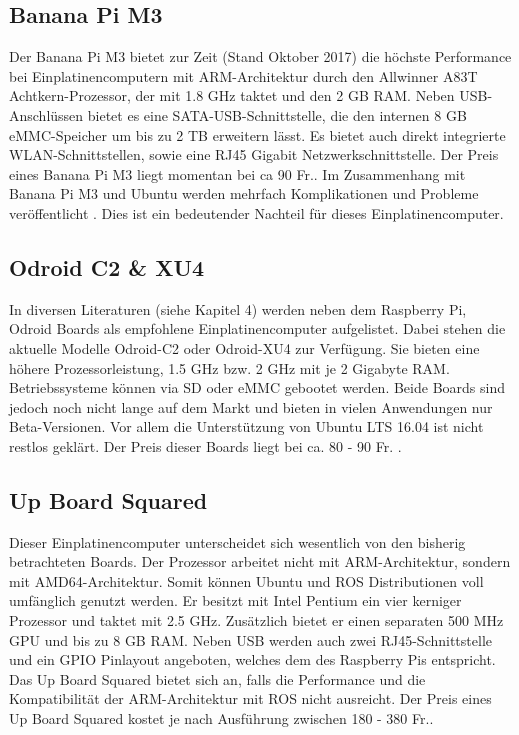 \subsection{Banana Pi M3}
\label{subsec:BananaPi}
Der Banana Pi M3 bietet zur Zeit (Stand Oktober 2017) die höchste Performance bei Einplatinencomputern mit \ac{ARM}-Architektur durch den Allwinner A83T Achtkern-Prozessor, der mit 1.8 GHz taktet und den 2 GB RAM. Neben USB-Anschlüssen bietet es eine SATA-USB-Schnittstelle, die den internen 8 GB \ac{eMMC}-Speicher um bis zu 2 TB erweitern lässt. Es bietet auch direkt integrierte WLAN-Schnittstellen, sowie eine RJ45 Gigabit Netzwerkschnittstelle. Der Preis eines Banana Pi M3 liegt momentan bei ca 90 Fr.. Im Zusammenhang mit Banana Pi M3 und Ubuntu werden mehrfach Komplikationen und Probleme veröffentlicht \cite{rpi} \cite{banana}. Dies ist ein bedeutender Nachteil für dieses Einplatinencomputer. 

\subsection{Odroid C2 \& XU4} 
\label{subsec:Odroid}
In diversen Literaturen (siehe \cite{ROSprojects} Kapitel 4) werden neben dem Raspberry Pi, Odroid Boards als empfohlene Einplatinencomputer aufgelistet. Dabei stehen die aktuelle Modelle Odroid-C2 oder Odroid-XU4 zur Verfügung. Sie bieten eine höhere Prozessorleistung, 1.5 GHz bzw. 2 GHz mit je 2 Gigabyte \ac{RAM}. Betriebssysteme können via \ac{SD} oder \ac{eMMC} gebootet werden. Beide Boards sind jedoch noch nicht lange auf dem Markt und bieten in vielen Anwendungen nur Beta-Versionen. Vor allem die Unterstützung von Ubuntu LTS 16.04 ist nicht restlos geklärt. \cite{ubuntuodroid} Der Preis dieser Boards liegt bei ca. 80 - 90 Fr. \cite{rpi}.

\subsection{Up Board Squared} 
\label{subsec:Up Board Squared}
Dieser Einplatinencomputer unterscheidet sich wesentlich von den bisherig betrachteten Boards. Der Prozessor arbeitet nicht mit \ac{ARM}-Architektur, sondern mit \ac{AMD64}-Architektur. Somit können Ubuntu und ROS Distributionen voll umfänglich genutzt werden. Er besitzt mit Intel Pentium ein vier kerniger Prozessor und taktet mit 2.5 GHz. Zusätzlich bietet er einen separaten 500 MHz \ac{GPU} und bis zu 8 GB \ac{RAM}. Neben USB werden auch zwei RJ45-Schnittstelle und ein GPIO Pinlayout angeboten, welches dem des Raspberry Pis entspricht. Das Up Board Squared bietet sich an, falls die Performance und die Kompatibilität der ARM-Architektur mit ROS nicht ausreicht. Der Preis eines Up Board Squared kostet je nach Ausführung zwischen 180 - 380 Fr..

